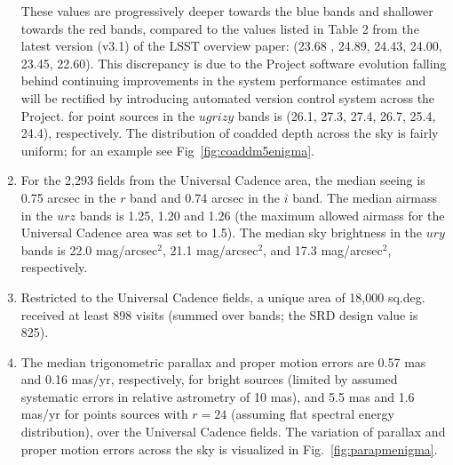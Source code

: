 \documentclass[manuscript]{article}
\begin{document}
\begin{enumerate}
{These values are progressively deeper towards the blue bands and shallower towards the red bands, 
compared to the values listed in Table 2 from the latest version (v3.1) of the LSST overview paper:  
(23.68 , 24.89, 24.43, 24.00, 23.45, 22.60). This discrepancy is due to the Project software
evolution falling behind continuing improvements in the system performance estimates and
will be rectified by introducing automated version control system across the Project.}  
for point sources in the $ugrizy$ bands is (26.1, 27.3, 27.4, 26.7, 25.4, 24.4), respectively. 
The distribution of coadded depth across the sky is fairly uniform; for an example see 
Fig~\ref{fig:coaddm5enigma}. 
\item For the 2,293 fields from the Universal Cadence area, the median seeing is 0.75 arcsec
in the $r$ band and 0.74 arcsec in the $i$ band. The median airmass in the $urz$ bands is 1.25, 1.20
and 1.26 (the maximum allowed airmass for the Universal Cadence area was set to 1.5).  The median 
sky brightness in the $ury$ bands is 22.0 mag/arcsec$^2$, 21.1 mag/arcsec$^2$, and 
17.3 mag/arcsec$^2$, respectively.  
\item Restricted to the Universal Cadence fields, a unique area of 18,000 sq.deg. received at least
898 visits (summed over bands; the SRD design value is 825). 
\item The median trigonometric parallax and proper motion errors are 0.57 mas and 0.16 mas/yr,
respectively, for bright sources (limited by assumed systematic errors in relative astrometry of 10 mas),
and 5.5 mas and 1.6 mas/yr for points sources with $r=24$ (assuming flat spectral energy 
distribution), over the Universal Cadence fields. The variation of parallax and proper motion errors
across the sky is visualized in Fig.~\ref{fig:parapmenigma}.
\end{enumerate}
\end{document}
